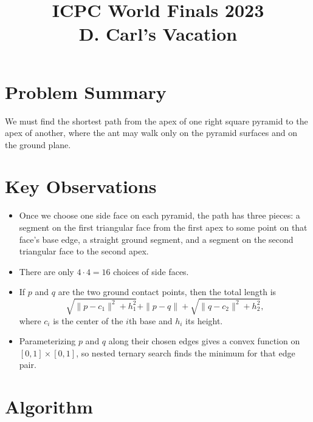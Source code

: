 \documentclass[11pt]{article}
\title{ICPC World Finals 2023\\D. Carl's Vacation}
\author{}
\date{}
\begin{document}
\maketitle

\section*{Problem Summary}

We must find the shortest path from the apex of one right square pyramid to the apex of another, where
the ant may walk only on the pyramid surfaces and on the ground plane.

\section*{Key Observations}

\begin{itemize}[leftmargin=*]
    \item Once we choose one side face on each pyramid, the path has three pieces: a segment on the first
    triangular face from the first apex to some point on that face's base edge, a straight ground segment,
    and a segment on the second triangular face to the second apex.
    \item There are only $4 \cdot 4 = 16$ choices of side faces.
    \item If $p$ and $q$ are the two ground contact points, then the total length is
    \[
    \sqrt{\|p-c_1\|^2+h_1^2}+\|p-q\|+\sqrt{\|q-c_2\|^2+h_2^2},
    \]
    where $c_i$ is the center of the $i$th base and $h_i$ its height.
    \item Parameterizing $p$ and $q$ along their chosen edges gives a convex function on
    $[0,1]\times[0,1]$, so nested ternary search finds the minimum for that edge pair.
\end{itemize}

\section*{Algorithm}
\end{document}

